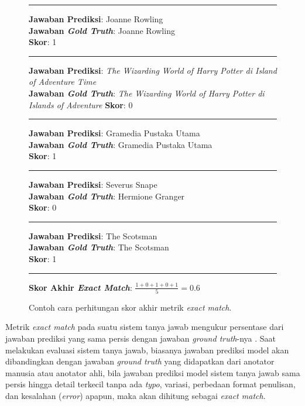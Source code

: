 \begin{figure}[h]
\vspace{3pt}
\hrule
\vspace{3pt}

\textbf{Jawaban Prediksi}: Joanne Rowling\\
\textbf{Jawaban \emph{Gold Truth}}: Joanne Rowling\\
\textbf{Skor}: 1

\vspace{3pt}
\hrule
\vspace{3pt}

\textbf{Jawaban Prediksi}: \emph{The Wizarding World of Harry Potter di Island of Adventure Time}\\
\textbf{Jawaban \emph{Gold Truth}}: \emph{The Wizarding World of Harry Potter di Islands of Adventure}
\textbf{Skor}: 0\\

\vspace{3pt}
\hrule
\vspace{3pt}

\textbf{Jawaban Prediksi}: Gramedia Pustaka Utama\\
\textbf{Jawaban \emph{Gold Truth}}: Gramedia Pustaka Utama\\
\textbf{Skor}: 1

\vspace{5pt}
\hrule
\vspace{5pt}

\textbf{Jawaban Prediksi}: Severus Snape\\
\textbf{Jawaban \emph{Gold Truth}}: Hermione Granger\\
\textbf{Skor}: 0

\vspace{3pt}
\hrule
\vspace{3pt}

\textbf{Jawaban Prediksi}: The Scotsman\\
\textbf{Jawaban \emph{Gold Truth}}: The Scotsman\\
\textbf{Skor}: 1

\vspace{3pt}
\hrule
\vspace{3pt}

\textbf{Skor Akhir \emph{Exact Match}}: $\frac{1+0+1+0+1}{5}=0.6$

\centering
\caption{Contoh cara perhitungan skor akhir metrik \emph{exact match}.}
\end{figure}

Metrik \emph{exact match} pada suatu sistem tanya jawab mengukur persentase dari jawaban prediksi yang sama persis dengan jawaban \emph{ground truth}-nya \citep{rajpurkar-etal-2016-squad}. Saat melakukan evaluasi sistem tanya jawab, biasanya jawaban prediksi model akan dibandingkan dengan jawaban \emph{ground truth} yang didapatkan dari anotator manusia atau anotator ahli, bila jawaban prediksi model sistem tanya jawab sama persis hingga detail terkecil tanpa ada \emph{typo}, variasi, perbedaan format penulisan, dan kesalahan (\emph{error}) apapun, maka akan dihitung sebagai \emph{exact match}.

